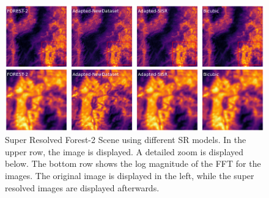         \begin{figure}[H]
            \centering
            \includegraphics[scale=0.28]{Includes/5-target_prediction_sample.pdf}
            \caption{Super Resolved Forest-2 Scene using different SR models.
                     In the upper row, the image is displayed. A detailed zoom is displayed below. The bottom row shows the log magnitude of the FFT for the images.
                     The original image is displayed in the left, while the super resolved images are displayed afterwards.
                    }
            \label{fig:5-target_prediction_sample}
        \end{figure}



